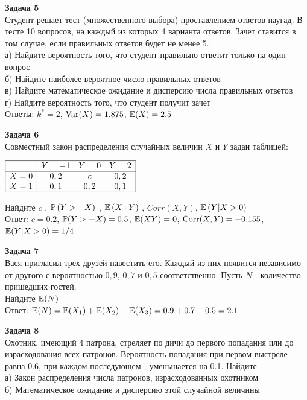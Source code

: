 \documentclass[12pt, a4paper]{article}\usepackage[]{graphicx}\usepackage[]{color}
\begin{document}
\textbf{Задача 5} \\ %
Студент решает тест (множественного выбора) проставлением
ответов наугад. В тесте 10 вопросов, на каждый из которых 4
варианта ответов. Зачет ставится в том случае, если правильных
ответов будет не менее 5. \\
а) Найдите вероятность того, что студент правильно ответит только
на один вопрос \\
б) Найдите наиболее вероятное число правильных ответов \\
в) Найдите математическое ожидание и дисперсию числа правильных
ответов \\
г) Найдите вероятность того, что студент получит зачет \\

Ответы: $k^*=2$, $\Var(X)=1.875$, $\E(X)=2.5$

\textbf{Задача 6} \\ %
Совместный закон распределения случайных величин  $X$  и  $Y$
задан таблицей:

$\begin{array}{|c|ccc|}
\hline
{} & {Y=-1} & {Y=0} & {Y=2}\\
\hline
{X=0} & {0,2} & {c} & {0,2}\\
{X=1} & {0,1} & {0,2} & {0,1} \\
\hline
\end{array}$

Найдите  $c$ ,  $\P\left(Y>-X\right)$ ,  $\E\left(X\cdot Y
\right)$ , $Corr(X,Y)$, $\E\left(Y|X>0\right)$ \\

Ответ: $c=0.2$, $\P(Y>-X)=0.5$, $\E(XY)=0$, $\Corr(X,Y)=-0.155$, $\E(Y|X>0)=1/4$

\textbf{Задача 7} \\ %
Вася пригласил трех друзей навестить его. Каждый из них появится
независимо от другого с вероятностью $0,9$, $0,7$ и $0,5$
соответственно. Пусть $N$ - количество пришедших гостей. \\
Найдите $\E(N)$ \\

Ответ: $\E(N)=\E(X_1)+\E(X_2)+\E(X_3)=0.9+0.7+0.5=2.1$

\textbf{Задача 8} \\ %
Охотник, имеющий 4 патрона, стреляет по дичи до первого
попадания или до израсходования всех патронов. Вероятность
попадания при первом выстреле равна 0.6, при каждом последующем -
уменьшается на 0.1. Найдите \\
а) Закон распределения числа патронов, израсходованных охотником \\
б) Математическое ожидание и дисперсию этой случайной величины \\
\end{document}
